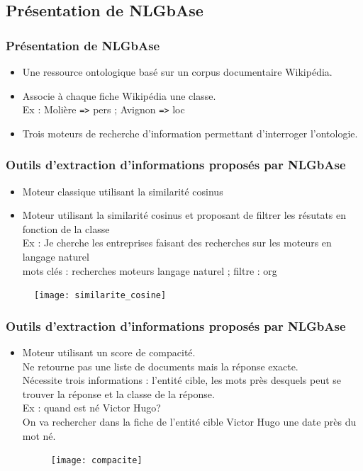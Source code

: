 \documentclass[xcolor=dvipsnames]{beamer}
\begin{document}
\subsection{Présentation de NLGbAse}
\frame
{
    \frametitle{Présentation de NLGbAse}
    \begin{itemize}
        \item Une ressource ontologique basé sur un corpus documentaire Wikipédia.
        \item Associe à chaque fiche Wikipédia une classe. \\
            Ex : Molière \texttt{=>} pers ; Avignon \texttt{=>} loc
        \item Trois moteurs de recherche d'information permettant d'interroger l'ontologie.
    \end{itemize}
}
\frame
{
    \frametitle{Outils d'extraction d'informations proposés par NLGbAse}
    \begin{itemize}
        \item<1-> Moteur classique utilisant la similarité cosinus
        \item<2-> Moteur utilisant la similarité cosinus et proposant de filtrer les résutats en fonction de la classe \\
                Ex : Je cherche les entreprises faisant des recherches sur les moteurs en langage naturel \\
                mots clés : recherches moteurs langage naturel ; filtre : org
   \end{itemize}
    \begin{figure}
        \texttt{[image: similarite\_cosine]}
    \end{figure}

}
\frame
{
    \frametitle{Outils d'extraction d'informations proposés par NLGbAse}
    \begin{itemize}
        \item<1-> Moteur utilisant un score de compacité. \\
               Ne retourne pas une liste de documents mais la réponse exacte. \\
               Nécessite trois informations : l'entité cible, les mots près desquels peut se trouver la réponse et la classe de la réponse.\\
               Ex : quand est né Victor Hugo? \\
               On va rechercher dans la fiche de l'entité cible Victor Hugo une date près du mot \og{}né\fg{}.
    \begin{figure}
        \texttt{[image: compacite]}
     \end{figure}
   \end{itemize}
}
 
\end{document}
